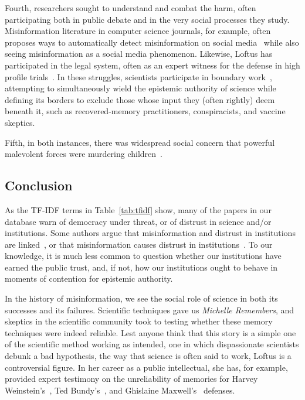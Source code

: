 \documentclass[          
 pre,
 twocolumn,
 twoside,
 superscriptaddress,
 amsmath,
 amssymb,                
 apsf
]{revtex4-2}
\begin{document}
Fourth, researchers sought to understand and combat the harm, often participating both in public debate and in the very social processes they study. Misinformation literature in computer science journals, for example, often proposes ways to automatically detect misinformation on social media~\cite{broda_misinformation_2024} while also seeing misinformation as a social media phenomenon. Likewise, Loftus has participated in the legal system, often as an expert witness for the defense in high profile trials~\cite{shewan_conviction_2015}. In these struggles, scientists participate in boundary work~\cite{gierynCulturalBoundariesScience1999}, attempting to simultaneously wield the epistemic authority of science while defining its borders to exclude those whose input they (often rightly) deem beneath it, such as recovered-memory practitioners, conspiracists, and vaccine skeptics. 

Fifth, in both instances, there was widespread social concern that powerful malevolent forces were murdering children~\cite{hearst_qanon_2022,shewan_conviction_2015}.



\subsection{Conclusion}
\label{conclusion}

As the TF-IDF terms in Table~\ref{tab:tfidf} show, many of the papers in our database warn of democracy under threat, or of distrust in science and/or institutions. Some authors argue that misinformation and distrust in institutions are linked~\cite{akyuz_impact_2021}, or that misinformation causes distrust in institutions~\cite{stetka_have_2025}. To our knowledge, it is much less common to question whether our institutions have earned the public trust, and, if not, how our institutions ought to behave in moments of contention for epistemic authority.

In the history of misinformation, we see the social role of science in both its successes and its failures. Scientific techniques gave us \textit{Michelle Remembers}, and skeptics in the scientific community took to testing whether these memory techniques were indeed reliable. Lest anyone think that this story is a simple one of the scientific method working as intended, one in which dispassionate scientists debunk a bad hypothesis, the way that science is often said to work, Loftus is a controversial figure. In her career as a public intellectual, she has, for example, provided expert testimony on the unreliability of memories for Harvey Weinstein's~\cite{press_harvey_2020}, Ted Bundy's~\cite{marsh_how_2012}, and Ghislaine Maxwell's~\cite{news_ghislaine_2021} defenses. 
\end{document}
